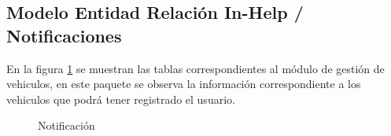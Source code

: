 \subsection{Modelo Entidad Relación In-Help / Notificaciones}
En la figura \ref{fig:BD_Notificacion} se muestran las tablas correspondientes al módulo de gestión de vehiculos, en este paquete se observa la información correspondiente a los vehiculos que podrá tener registrado el usuario.
\begin{figure}[htbp!]
	\centering
	\caption{Notificación}
	\label{fig:BD_Notificacion}
\end{figure}

